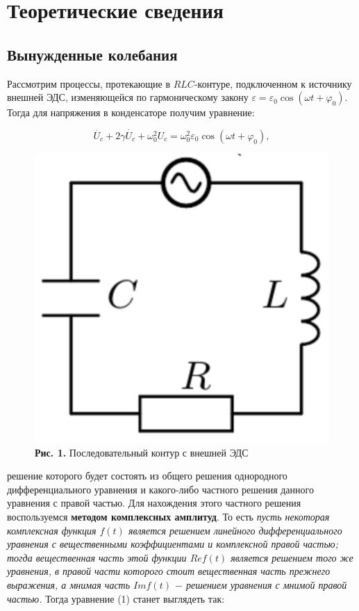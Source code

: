 \documentclass[a4paper,12pt]{article} %
\begin{document}
\section{Теоретические сведения}
\subsection{Вынужденные колебания}
\hfill \break Рассмотрим процессы, протекающие в $RLC$-контуре, подключенном к источнику внешней ЭДС, изменяющейся по гармоническому закону $\varepsilon = \varepsilon_{0}\cos{(\omega t + \varphi_{0})}$. Тогда для напряжения в конденсаторе получим уравнение:

\begin{equation}\label{ linkname }
\ddot{U_{c}} + 2\gamma \dot{U_{c}} + \omega_{0}^2U_{c} = \omega_{0}^2\varepsilon_{0}\cos{(\omega t + \varphi_{0})},
\end{equation}

\begin{figure}
\begin{center}
    \includegraphics[width=1\textwidth]{3.2.2_1.png}
    \textbf{Рис. 1.} Последовательный контур с внешней ЭДС
\end{center}
\end{figure}

\hfill \break решение которого будет состоять из общего решения однородного дифференциального уравнения и какого-либо частного решения данного уравнения с правой частью. Для нахождения этого частного решения воспользуемся \textbf{методом комплексных амплитуд}. То есть \textit{пусть некоторая комплексная функция $f(t)$ является решением линейного дифференциального уравнения с вещественными коэффициентами и комплексной правой частью; тогда вещественная часть этой функции $Re f(t)$ является решением того же уравнения, в правой части которого стоит вещественная часть прежнего выражения, а мнимая часть $Im f(t)$ $-$ решением уравнения с мнимой правой частью.} Тогда уравнение (1) станет выглядеть так:
\end{document}

